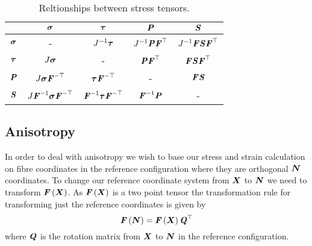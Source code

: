 \begin{table}[htb] \centering
  \begin{tabular}{|c|c|c|c|c|} \hline
    & $\boldsymbol{\mathit{\sigma}}$ & $\boldsymbol{\mathit{\tau}}$ & $\boldsymbol{\mathit{P}}$ & $\boldsymbol{\mathit{S}}$
    \\ \hline \hline
    $\boldsymbol{\mathit{\sigma}}$ & - & ${J}^{-1}\boldsymbol{\mathit{\tau}}$ &
    ${J}^{-1}\boldsymbol{\mathit{P}} {\boldsymbol{\mathit{F}}}^{ \top } $ &
    ${J}^{-1}\boldsymbol{\mathit{F}}\boldsymbol{\mathit{S}} {\boldsymbol{\mathit{F}}}^{ \top } $ \\
    $\boldsymbol{\mathit{\tau}}$ & $J\boldsymbol{\mathit{\sigma}}$ & - &
    $\boldsymbol{\mathit{P}} {\boldsymbol{\mathit{F}}}^{ \top } $ &
    $\boldsymbol{\mathit{F}}\boldsymbol{\mathit{S}} {\boldsymbol{\mathit{F}}}^{ \top } $ \\
    $\boldsymbol{\mathit{P}}$ & $J\boldsymbol{\mathit{\sigma}} {\boldsymbol{\mathit{F}}}^{- \top } $ &
    $\boldsymbol{\mathit{\tau}} {\boldsymbol{\mathit{F}}}^{- \top } $ & - & $\boldsymbol{\mathit{F}}\boldsymbol{\mathit{S}}$ \\
    $\boldsymbol{\mathit{S}}$ &
    $J{\boldsymbol{\mathit{F}}}^{-1}\boldsymbol{\mathit{\sigma}} {\boldsymbol{\mathit{F}}}^{- \top } $ &
    ${\boldsymbol{\mathit{F}}}^{-1}\boldsymbol{\mathit{\tau}} {\boldsymbol{\mathit{F}}}^{- \top } $ &
    ${\boldsymbol{\mathit{F}}}^{-1}\boldsymbol{\mathit{P}}$ & - \\ \hline
  \end{tabular}
  \caption{Reltionships between stress tensors.}
  \label{tab:RelationshipBetweenStressTensors}
\end{table}

\subsection{Anisotropy}

In order to deal with anisotropy we wish to base our stress and strain
calculation on fibre coordinates in the reference configuration where they are
orthogonal \ie $ \boldsymbol{N} $ coordinates. To change our reference coordinate
system from $ \boldsymbol{X} $ to $ \boldsymbol{N} $ we need to transform
$ \boldsymbol{\mathit{F}}\left(  \boldsymbol{X}  \right) $. As $ \boldsymbol{\mathit{F}}\left(  \boldsymbol{X}  \right) $ is a two
point tensor the transformation rule for transforming just the reference
coordinates is given by
\begin{equation}
   \boldsymbol{\mathit{F}}\left(  \boldsymbol{N}  \right) = \boldsymbol{\mathit{F}}\left(  \boldsymbol{X}  \right)  {\boldsymbol{\mathit{Q}}}^{ \top } 
\end{equation}
where $\boldsymbol{\mathit{Q}}$ is the rotation matrix from $ \boldsymbol{X} $ to $ \boldsymbol{N} $ in
the reference configuration.

